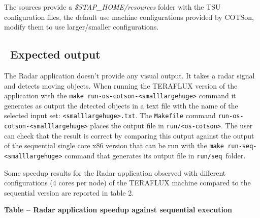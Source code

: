 \documentclass[a4paper]{article}
\newcounter{Table}
\renewcommand\theTable{\arabic{Table}}
\begin{document}
{
The sources provide a \textit{\$STAP\_HOME/resources} folder with the
TSU configuration files, the default use machine configurations
provided by COTSon, modify them to use larger/smaller configurations.}

\subsection[\ Expected output]{\foreignlanguage{english}{\ }Expected
output}
{
The Radar application doesn{\textquoteright}t provide any visual output.
It takes a radar signal and detects moving objects. When running the
TERAFLUX version of the application with the \texttt{make
run-os-cotson-{\textless}small{\textbar}large{\textbar}huge{\textgreater}}
command it generates as output the detected objects in a text file with
the name of the selected input set:
\texttt{{\textless}small{\textbar}large{\textbar}huge{\textgreater}.txt}.
The \texttt{Makefile} command
\texttt{run-os-cotson-{\textless}small{\textbar}large{\textbar}huge{\textgreater}}
places the output file in
\texttt{run/{\textless}os-cotson{\textgreater}}. The user can check
that the result is correct by comparing this output against the output
of the sequential single core x86 version that can be run with the
\texttt{make
run-seq-{\textless}small{\textbar}large{\textbar}huge{\textgreater}}
command that generates its output file in \texttt{run/seq }folder.}

{
Some speedup results for the Radar application observed with different
configurations (4 cores per node) of the TERAFLUX machine compared to
the sequential version are reported in table 2.}

{\centering{}\sffamily\bfseries
Table
\stepcounter{Table}{\theTable} -- Radar application speedup against
sequential execution
\par}
\end{document}
